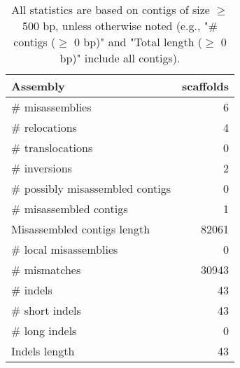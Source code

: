 \documentclass[12pt,a4paper]{article}
\begin{document}
\begin{table}[ht]
\begin{center}
\caption{All statistics are based on contigs of size $\geq$ 500 bp, unless otherwise noted (e.g., "\# contigs ($\geq$ 0 bp)" and "Total length ($\geq$ 0 bp)" include all contigs).}
\begin{tabular}{|l*{1}{|r}|}
\hline
Assembly & scaffolds \\ \hline
\# misassemblies & 6 \\ \hline
\hspace{5mm}\# relocations & 4 \\ \hline
\hspace{5mm}\# translocations & 0 \\ \hline
\hspace{5mm}\# inversions & 2 \\ \hline
\# possibly misassembled contigs & 0 \\ \hline
\# misassembled contigs & 1 \\ \hline
Misassembled contigs length & 82061 \\ \hline
\# local misassemblies & 0 \\ \hline
\# mismatches & 30943 \\ \hline
\# indels & 43 \\ \hline
\hspace{5mm}\# short indels & 43 \\ \hline
\hspace{5mm}\# long indels & 0 \\ \hline
Indels length & 43 \\ \hline
\end{tabular}
\end{center}
\end{table}
\end{document}

